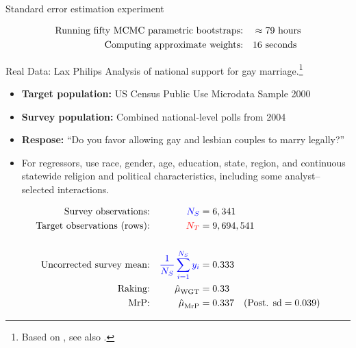 

\begin{frame}[t]{Standard error estimation experiment}

\wholeslidefig{\BootstrapPlot{}}

\pause
$$
\begin{aligned}
    \textrm{Running fifty MCMC parametric bootstraps:}\quad & \approx 79 \textrm{ hours} \\
    \textrm{Computing approximate weights:}\quad &16 \textrm{ seconds}\\
\end{aligned}
$$
\end{frame}





\begin{frame}{Real Data: Lax Philips}
Analysis of national support for gay marriage.\footnote{Based on \textcite{kastellec:2010:laxmrp},
see also \textcite{lax:2009:gay}.}

\begin{itemize}
    \item \textbf{Target population:} US Census Public Use Microdata Sample 2000
    \item \textbf{Survey population:} Combined national-level polls from 2004
    \item \textbf{Respose:}  ``Do you favor allowing gay and lesbian couples to marry legally?''
    \item For regressors, use race, gender, age, education, state, region,
        and continuous statewide religion and political characteristics, including
        some analyst--selected interactions.
\end{itemize}

$$
\begin{aligned}
    \textrm{Survey observations:} &&  \textcolor{blue}{{\textcolor{blue}{N_S}}} ={}& 6,341  \\
    \textrm{Target observations (rows):} &&  \textcolor{red}{{\textcolor{red}{N_T}}} ={}& 9,694,541 \\
    \\
    \textrm{Uncorrected survey mean:} && \textcolor{blue}{\frac{1}{{\textcolor{blue}{N_S}}} \sum_{i=1}^{\textcolor{blue}{N_S}} y_i} ={}& 0.333 \\
    \textrm{Raking:} && \hat{\mu}^{}_{\mathrm{WGT}} ={}& 0.33 \\
    \textrm{MrP:} && \hat{\mu}^{}_{\mathrm{MrP}} ={}& 0.337
        \quad(\textrm{Post. sd} = 0.039)\\
\end{aligned}
$$
%
\end{frame}



